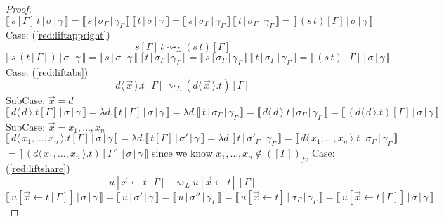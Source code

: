 \documentclass[a4paper,UKenglish,cleveref, autoref]{lipics-v2019}
\newcommand{\fv}[1]{(#1)_{fv}}
\newcommand{\abs}[2]{\lambda #1 . #2}
\newcommand{\app}[2]{#1 \, #2}
\newcommand{\fake}[3]{#1 \langle \, #2 \, \rangle . #3}
\newcommand{\share}[3]{#1 [#2 \leftarrow #3]}
\newcommand{\readbackwmap}[3]{\llbracket \, #1 \, \vert \, #2 \, \vert \, #3  \, \rrbracket }
\begin{document}
\begin{proof}
\newline
$\readbackwmap{\app{s[\Gamma]}{t}}{\sigma}{\gamma} = \app{\readbackwmap{s}{\sigma_{\Gamma}}{\gamma_{\Gamma}}}{\readbackwmap{t}{\sigma}{\gamma}} = \app{\readbackwmap{s}{\sigma_{\Gamma}}{\gamma_{\Gamma}}}{\readbackwmap{t}{\sigma_{\Gamma}}{\gamma_{\Gamma}}} = \readbackwmap{(\app{s}{t}) [\Gamma]}{\sigma}{\gamma}$
\newline
\newline
Case: (\ref{red:liftappright})
$$\app{s[\Gamma]}{t} \rightsquigarrow_{L} (\app{s}{t})[\Gamma]$$
$\readbackwmap{\app{s}{(t [\Gamma])}}{\sigma}{\gamma} = \app{\readbackwmap{s}{\sigma}{\gamma}}{\readbackwmap{t}{\sigma_{\Gamma}}{\gamma_{\Gamma}}} = \app{\readbackwmap{s}{\sigma_{\Gamma}}{\gamma_{\Gamma}}}{\readbackwmap{t}{\sigma_{\Gamma}}{\gamma_{\Gamma}}} = \readbackwmap{(\app{s}{t}) [\Gamma]}{\sigma}{\gamma}$
\newline
\newline
Case: (\ref{red:liftabs})
$$\fake{d}{\vec{x}}{t[\Gamma]} \rightsquigarrow_{L} (\fake{d}{\vec{x}}{t})[\Gamma] $$
\newline
\indent SubCase: $\vec{x} = d$
\newline
$\readbackwmap{\fake{d}{d}{t[\Gamma]}}{\sigma}{\gamma} = \abs{d}{\readbackwmap{t [\Gamma]}{\sigma}{\gamma}} = \abs{d}{\readbackwmap{t}{\sigma_{\Gamma}}{\gamma_{\Gamma}}} = \readbackwmap{\fake{d}{d}{t}}{\sigma_{\Gamma}}{\gamma_{\Gamma}} = \readbackwmap{(\fake{d}{d}{t}) [\Gamma]}{\sigma}{\gamma}$
\newline
\newline
\indent SubCase: $\vec{x} = x_{1}, \dots, x_{n}$
\newline
$\readbackwmap{\fake{d}{x_{1}, \dots, x_{n}}{t[\Gamma]}}{\sigma}{\gamma} = \abs{d}{\readbackwmap{t [\Gamma]}{\sigma'}{\gamma}} = \abs{d}{\readbackwmap{t}{\sigma'_{\Gamma}}{\gamma_{\Gamma}}} = \readbackwmap{\fake{d}{x_{1}, \dots, x_{n}}{t}}{\sigma_{\Gamma}}{\gamma_{\Gamma}}$
\newline
$= \readbackwmap{(\fake{d}{x_{1}, \dots, x_{n}}{t}) [\Gamma]}{\sigma}{\gamma}$
\newline
since we know $x_{1}, \dots, x_{n} \not\in \fv{[\Gamma]}$
\newline
\newline
Case: (\ref{red:liftshare})
$$\share{u}{\vec{x}}{t[\Gamma]} \rightsquigarrow_{L} \share{u}{\vec{x}}{t}[\Gamma]$$
$\readbackwmap{\share{u}{\vec{x}}{t[\Gamma]}}{\sigma}{\gamma} = \readbackwmap{u}{\sigma'}{\gamma} = \readbackwmap{u}{\sigma''}{\gamma_{\Gamma}} = \readbackwmap{\share{u}{\vec{x}}{t}}{\sigma_{\Gamma}}{\gamma_{\Gamma}} = \readbackwmap{\share{u}{\vec{x}}{t[\Gamma]}}{\sigma}{\gamma}$

\end{proof}
\end{document}
